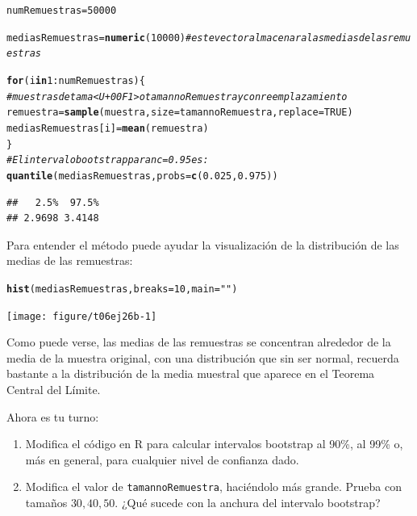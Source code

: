 \documentclass[10pt,a4paper]{article}\usepackage[]{graphicx}\usepackage[]{color}
\makeatletter
\newcommand{\hlnum}[1]{\textcolor[rgb]{0.686,0.059,0.569}{#1}}%
\newcommand{\hlstr}[1]{\textcolor[rgb]{0.192,0.494,0.8}{#1}}%
\newcommand{\hlcom}[1]{\textcolor[rgb]{0.678,0.584,0.686}{\textit{#1}}}%
\newcommand{\hlopt}[1]{\textcolor[rgb]{0,0,0}{#1}}%
\newcommand{\hlstd}[1]{\textcolor[rgb]{0.345,0.345,0.345}{#1}}%
\newcommand{\hlkwa}[1]{\textcolor[rgb]{0.161,0.373,0.58}{\textbf{#1}}}%
\newcommand{\hlkwb}[1]{\textcolor[rgb]{0.69,0.353,0.396}{#1}}%
\newcommand{\hlkwc}[1]{\textcolor[rgb]{0.333,0.667,0.333}{#1}}%
\newcommand{\hlkwd}[1]{\textcolor[rgb]{0.737,0.353,0.396}{\textbf{#1}}}%
\newenvironment{kframe}{%
 \def\at@end@of@kframe{}%
 \ifinner\ifhmode%
  \def\at@end@of@kframe{\end{minipage}}%
  \begin{minipage}{\columnwidth}%
 \fi\fi%
 \def\FrameCommand##1{\hskip\@totalleftmargin \hskip-\fboxsep
 \colorbox{shadecolor}{##1}\hskip-\fboxsep
     \hskip-\linewidth \hskip-\@totalleftmargin \hskip\columnwidth}%
 \MakeFramed {\advance\hsize-\width
   \@totalleftmargin\z@ \linewidth\hsize
   \@setminipage}}%
 {\par\unskip\endMakeFramed%
 \at@end@of@kframe}
\newenvironment{knitrout}{}{} %
\makeatother
\begin{document}
\begin{ejercicio}
\begin{knitrout}
\begin{kframe}
\begin{alltt}
\hlstd{numRemuestras} \hlkwb{=} \hlnum{50000}

\hlstd{mediasRemuestras} \hlkwb{=} \hlkwd{numeric}\hlstd{(}\hlnum{10000}\hlstd{)} \hlcom{# este vector almacenara las medias de las remuestras}

\hlkwa{for}\hlstd{(i} \hlkwa{in} \hlnum{1}\hlopt{:}\hlstd{numRemuestras)\{}
  \hlcom{# muestras de tama<U+00F1>o tamannoRemuestra y con reemplazamiento}
  \hlstd{remuestra} \hlkwb{=} \hlkwd{sample}\hlstd{(muestra,} \hlkwc{size} \hlstd{= tamannoRemuestra,} \hlkwc{replace} \hlstd{=} \hlnum{TRUE}\hlstd{)}
  \hlstd{mediasRemuestras[i]} \hlkwb{=} \hlkwd{mean}\hlstd{(remuestra)}
\hlstd{\}}
\hlcom{# El intervalo bootstrap para nc=0.95 es:}
\hlkwd{quantile}\hlstd{(mediasRemuestras,} \hlkwc{probs} \hlstd{=} \hlkwd{c}\hlstd{(}\hlnum{0.025}\hlstd{,} \hlnum{0.975}\hlstd{))}
\end{alltt}
\begin{verbatim}
##   2.5%  97.5% 
## 2.9698 3.4148
\end{verbatim}
\end{kframe}
\end{knitrout}

Para entender el método puede ayudar la visualización de la distribución de las medias de las remuestras:
\begin{knitrout}
\color{fgcolor}\begin{kframe}
\begin{alltt}
\hlkwd{hist}\hlstd{(mediasRemuestras,} \hlkwc{breaks} \hlstd{=} \hlnum{10}\hlstd{,} \hlkwc{main}\hlstd{=}\hlstr{""}\hlstd{)}
\end{alltt}
\end{kframe}
\texttt{[image: figure/t06ej26b-1]} 

\end{knitrout}
Como puede verse, las medias de las remuestras se concentran alrededor de la media de la muestra original, con una distribución que sin ser normal, recuerda bastante a la distribución de la media muestral que aparece en el Teorema Central del Límite.

Ahora es tu turno:
\begin{enumerate}
  \item Modifica el código en R para calcular intervalos bootstrap al 90\%, al 99\% o, más en general, para cualquier nivel de confianza dado.
  \item Modifica el valor de {\tt tamannoRemuestra}, haciéndolo más grande. Prueba con tamaños $30, 40, 50$. ¿Qué sucede con la anchura del intervalo bootstrap?


\end{enumerate}
\end{ejercicio}
\end{document}
